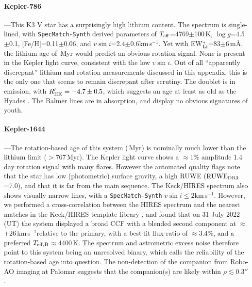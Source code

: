 \documentclass[11pt,twocolumn,tighten]{aastex63}
\newcommand{\kms}{{km\,s$^{-1}$}}
\begin{document}


\paragraph{Kepler-786}---This K3 V star has a surprisingly high
lithium content.  The spectrum is single-lined, with
\texttt{SpecMatch-Synth} derived parameters of $T_{\rm
eff}$=4769$\pm$100\,K, $\log g$=4.5$\pm$0.1, [Fe/H]=0.11$\pm$0.06, and
$v\sin i$=2.4$\pm$0.6\kms.  Yet with EW$_{\rm
Li}^{\ast}$=83$\pm$6\,m\AA, the lithium age of \kepseveneightsix\,Myr
would predict an obvious rotation signal.  None is present in the
Kepler light curve, consistent with the low $v\sin i$.  Out of all
``apparently discrepant'' lithium and rotation measurements discussed
in this appendix, this is the only one that seems to remain discrepant
after scrutiny.  The   doublet is in emission, with
$R'_{\rm HK}=-4.7\pm0.5$, which suggests an age at least as old as the
Hyades \citep{Mamajek_2008}.  The Balmer lines are in absorption, and
display no obvious signatures of youth.


\paragraph{Kepler-1644}---The rotation-based age of this system
(\kepsixteenfourfour\,Myr) is nominally much lower than the lithium
limit ($>$767\,Myr).  The Kepler light curve shows a $\approx$1\%
amplitude 1.4\,day rotation signal with many flares.  However the
automated quality flags note that the star has low (photometric)
surface gravity, a high RUWE (${\rm RUWE}_{\rm DR3}$=7.0), and that it
is far from the main sequence.  The Keck/HIRES spectrum also shows
visually narrow lines, with a \texttt{SpecMatch-Synth} $v \sin i \leq
2$\kms.  However, we performed a cross-correlation between the HIRES
spectrum and the nearest matches in the Keck/HIRES template library
\citep{2015AJ....149...18K}, and found that on 31 July 2022 (UT) the
system displayed a broad CCF with a blended second component at
$\approx$$+26$\,\kms relative to the primary, with a best-fit
flux-ratio of $\approx$3.4\%, and a preferred $T_{\rm
eff,B}$$\approx$4400\,K.  The spectrum and astrometric excess noise
therefore point to this system being an unresolved binary, which calls
the reliability of the rotation-based age into question.  The
non-detection of the companion from Robo-AO imaging at Palomar
\citep{2017AJ....153...66Z} suggests that the companion(s) are likely
within $\rho$$\lesssim$0.3$''$.
\end{document}
